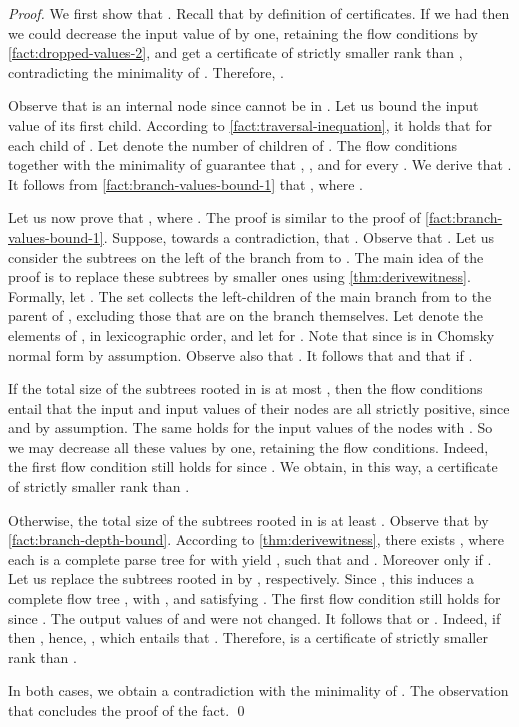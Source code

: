 \FactBranchValuesBoundThree*
\begin{proof}
  We first show that .
  Recall that  by definition of certificates.
  If we had  then we could
  decrease the input value of  by one,
  retaining the flow conditions by \cref{fact:dropped-values-2},
  and get a certificate
  of strictly smaller rank than ,
  contradicting the minimality of .
  Therefore, .

  Observe that  is an internal node since 
  cannot be in .
  Let us bound the input value of its first child.
  According to \cref{fact:traversal-inequation},
  it holds that 
  for each child  of .
  Let  denote the number of children of .
  The flow conditions together with
  the minimality of  guarantee that
  ,
  , and
   for every .
  We derive that .
  It follows from \cref{fact:branch-values-bound-1} that
  ,
  where .

  Let us now prove that ,
  where .
  The proof is similar to the proof of \cref{fact:branch-values-bound-1}.
  Suppose, towards a contradiction, that .
  Observe that .
  Let us consider the subtrees on the left of the branch from  to .
  The main idea of the proof is to replace these subtrees by smaller ones
  using \cref{thm:derivewitness}.
  Formally,
  let .
  The set  collects the left-children of the main branch from  to the parent of ,
  excluding those that are on the branch themselves.
  Let  denote the elements of ,
  in lexicographic order,
  and let  for .
  Note that  since  is in Chomsky normal form by assumption.
  Observe also that .
  It follows that
   and that
   if .

  If the total size of the subtrees rooted in  is
  at most ,
  then the flow conditions entail that
  the input and input values of their nodes are all strictly positive,
  since  and  by assumption.
  The same holds for the input values of the nodes  with
  .
  So we may decrease all these values by one,
  retaining the flow conditions.
  Indeed,
  the first flow condition still holds for 
  since .
  We obtain, in this way,
  a certificate of strictly smaller rank than .

  Otherwise,
  the total size of the subtrees rooted in  is
  at least .
  Observe that  by \cref{fact:branch-depth-bound}.
  According to \cref{thm:derivewitness},
  there exists ,
  where each  is a complete parse tree for  with
  yield ,
  such that 
  and .
  Moreover  only if .
  Let us replace the subtrees rooted in 
  by , respectively.
  Since ,
  this induces a complete flow tree
  ,
  with , and
  satisfying
  .
  The first flow condition still holds for  since
  .
  The output values of  and  were not changed.
  It follows that  or .
  Indeed,
  if  then
  , hence, ,
  which entails that .
  Therefore,
   is a certificate
  of strictly smaller rank than .

  In both cases,
  we obtain a contradiction with the minimality of .
  The observation that 
  concludes the proof of the fact.
  \qed
\end{proof}

